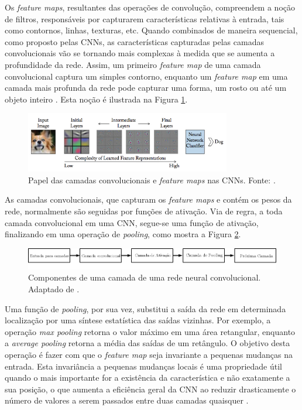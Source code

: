 Os \emph{feature maps}, resultantes das operações de convolução, compreendem a noção de filtros, responsáveis por capturarem características relativas à entrada, tais como contornos, linhas, texturas, etc. Quando combinados de maneira sequencial, como proposto pelas CNNs, as características capturadas pelas camadas convolucionais vão se tornando mais complexas à medida que se aumenta a profundidade da rede. Assim, um primeiro \emph{feature map} de uma camada convolucional captura um simples contorno, enquanto um \emph{feature map} em uma camada mais profunda da rede pode capturar uma forma, um rosto ou até um objeto inteiro \cite{Buduma:Livro}. Esta noção é ilustrada na Figura \ref{fig:convolutions}.

\begin{figure}[!ht]
	\centering
	\caption{Papel das camadas convolucionais e \emph{feature maps} nas CNNs. Fonte: \cite{Khan:Livro}.}
	\label{fig:convolutions}
	\includegraphics[width=0.8\textwidth]{./img/fundamenta/convolutions}
\end{figure}

As camadas convolucionais, que capturam os \emph{feature maps} e contém os pesos da rede, normalmente são seguidas por funções de ativação. Via de regra, a toda camada convolucional em uma CNN, segue-se uma função de ativação, finalizando em uma operação de \emph{pooling}, como mostra a Figura \ref{fig:cnn_camada}.

\begin{figure}[!ht]
	\centering
	\caption{Componentes de uma camada de uma rede neural convolucional. Adaptado de \cite{goodfellow2016deep}.}
	\label{fig:cnn_camada}
	\includegraphics[width=\textwidth]{img/cnn_camada_ipe.png}
\end{figure}

 Uma função de \emph{pooling}, por sua vez, substitui a saída da rede em determinada localização por uma síntese estatística das saídas vizinhas. Por exemplo, a operação \emph{max pooling} retorna o valor máximo em uma área retangular, enquanto a \emph{average pooling} retorna a média das saídas de um retângulo. O objetivo desta operação é fazer com que o \emph{feature map} seja invariante a pequenas mudanças na entrada. Esta invariância a pequenas mudanças locais é uma propriedade útil quando o mais importante for a existência da característica e não exatamente a sua posição, o que aumenta a eficiência geral da CNN ao reduzir drasticamente o número de valores a serem passados entre duas camadas quaisquer \cite{goodfellow2016deep}.


